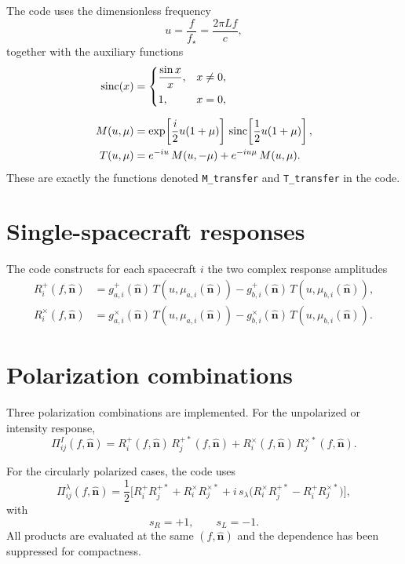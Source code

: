 \documentclass[11pt]{article}
\begin{document}
The code uses the dimensionless frequency
\begin{equation}
u = \frac{f}{f_\star} = \frac{2\pi L f}{c},
\end{equation}
together with the auxiliary functions
\begin{align}
{\rm sinc}(x) &=
\begin{cases}
\dfrac{\sin x}{x}, & x\neq 0, \\[6pt]
1, & x=0,
\end{cases}
\\[6pt]
M(u,\mu) &= \exp\!\left[\frac{i}{2}u(1+\mu)\right]\,
{\rm sinc}\!\left[\frac{1}{2}u(1+\mu)\right], \\
T(u,\mu) &= e^{-iu}\,M(u,-\mu) + e^{-iu\mu}\,M(u,\mu).
\end{align}
These are exactly the functions denoted \texttt{M\_transfer} and \texttt{T\_transfer} in the code.

\section{Single-spacecraft responses}

The code constructs for each spacecraft $i$ the two complex response amplitudes
\begin{align}
R_i^+(f,\hat{\bm n})
&=
g^+_{a,i}(\hat{\bm n})\,T\!\left(u,\mu_{a,i}(\hat{\bm n})\right)
-
g^+_{b,i}(\hat{\bm n})\,T\!\left(u,\mu_{b,i}(\hat{\bm n})\right), \\
R_i^\times(f,\hat{\bm n})
&=
g^\times_{a,i}(\hat{\bm n})\,T\!\left(u,\mu_{a,i}(\hat{\bm n})\right)
-
g^\times_{b,i}(\hat{\bm n})\,T\!\left(u,\mu_{b,i}(\hat{\bm n})\right).
\end{align}

\section{Polarization combinations}

Three polarization combinations are implemented.
For the unpolarized or intensity response,
\begin{equation}
\Pi^I_{ij}(f,\hat{\bm n})
=
R_i^+(f,\hat{\bm n})\,R_j^{+*}(f,\hat{\bm n})
+
R_i^\times(f,\hat{\bm n})\,R_j^{\times *}(f,\hat{\bm n}).
\end{equation}

For the circularly polarized cases, the code uses
\begin{equation}
\Pi^\lambda_{ij}(f,\hat{\bm n})
=
\frac{1}{2}
\Big[
R_i^+R_j^{+*}
+
R_i^\times R_j^{\times *}
+
i\,s_\lambda
\big(
R_i^\times R_j^{+*}
-
R_i^+ R_j^{\times *}
\big)
\Big],
\end{equation}
with
\begin{equation}
s_R = +1,
\qquad
s_L = -1.
\end{equation}
All products are evaluated at the same $(f,\hat{\bm n})$ and the dependence has been suppressed for compactness.
\end{document}
